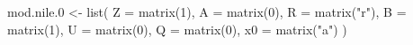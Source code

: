 \begin{Schunk}
\begin{Sinput}
 mod.nile.0 <- list(
   Z = matrix(1), A = matrix(0), R = matrix("r"),
   B = matrix(1), U = matrix(0), Q = matrix(0),
   x0 = matrix("a")
 )
\end{Sinput}
\end{Schunk}
